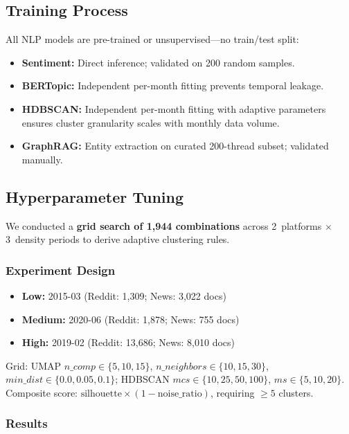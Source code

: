 \documentclass[12pt, a4paper]{article}
\begin{document}
\subsection{Training Process}

All NLP models are pre-trained or unsupervised---no train/test split:
\begin{itemize}[leftmargin=*]
  \item \textbf{Sentiment:} Direct inference; validated on 200 random samples.
  \item \textbf{BERTopic:} Independent per-month fitting prevents temporal leakage.
  \item \textbf{HDBSCAN:} Independent per-month fitting with adaptive parameters ensures cluster granularity scales with monthly data volume.
  \item \textbf{GraphRAG:} Entity extraction on curated 200-thread subset; validated manually.
\end{itemize}

\subsection{Hyperparameter Tuning}

We conducted a \textbf{grid search of 1,944 combinations} across 2~platforms $\times$ 3~density periods to derive adaptive clustering rules.

\subsubsection{Experiment Design}
\begin{itemize}[leftmargin=*, nosep]
  \item \textbf{Low:} 2015-03 (Reddit: 1,309; News: 3,022 docs)
  \item \textbf{Medium:} 2020-06 (Reddit: 1,878; News: 755 docs)
  \item \textbf{High:} 2019-02 (Reddit: 13,686; News: 8,010 docs)
\end{itemize}

Grid: UMAP $n\_comp \in \{5,10,15\}$, $n\_neighbors \in \{10,15,30\}$, $min\_dist \in \{0.0, 0.05, 0.1\}$; HDBSCAN $mcs \in \{10,25,50,100\}$, $ms \in \{5,10,20\}$. Composite score: $\text{silhouette} \times (1 - \text{noise\_ratio})$, requiring $\geq 5$ clusters.

\subsubsection{Results}
\end{document}
